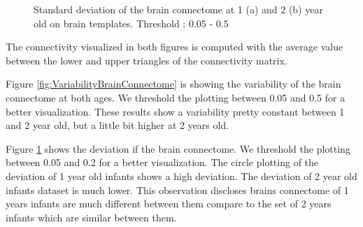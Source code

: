 \documentclass[]{spie}  %
\begin{document}
\begin{figure}
\centering 
{}
\caption[Standard deviation of the brain connectome at 1 (a) and 2 (b) year old on brain templates ]{Standard deviation of the brain connectome at 1 (a) and 2 (b) year old on brain templates. Threshold : 0.05 - 0.5}
\label{fig:DeviationBrainConnectome}
\end{figure} 

The connectivity visualized in both figures is computed with the average value between the lower and upper triangles of the connectivity matrix.

Figure \ref{fig:VariabilityBrainConnectome} is showing the variability of the brain connectome at both ages. We threshold the plotting between 0.05 and 0.5 for a better visualization.
These results show a variability pretty constant between 1 and 2 year old, but a little bit higher at 2 years old.

Figure \ref{fig:DeviationBrainConnectome} shows the deviation if the brain connectome. 
We threshold the plotting between 0.05 and 0.2 for a better visualization. The circle plotting of the deviation of 1 year old infants shows a high deviation. The deviation of 2 year old infants dataset is much lower. This observation discloses brains connectome of 1 years infants are much different between them compare to the set of 2 years infants which are similar between them.
\end{document}
